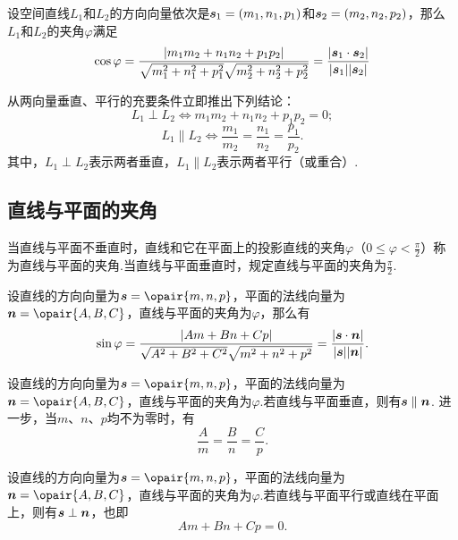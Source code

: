 \begin{theorem}
设空间直线\(L_1\)和\(L_2\)的方向向量依次是\(\boldsymbol{s}_1=(m_1,n_1,p_1)\)和\(\boldsymbol{s}_2=(m_2,n_2,p_2)\)，那么\(L_1\)和\(L_2\)的夹角\(\varphi\)满足\[
\cos\varphi
=\frac{\abs{m_1m_2+n_1n_2+p_1p_2}}{\sqrt{m_1^2+n_1^2+p_1^2}\sqrt{m_2^2+n_2^2+p_2^2}}
=\frac{\abs{\boldsymbol{s}_1 \cdot \boldsymbol{s}_2}}{\abs{\boldsymbol{s}_1}\abs{\boldsymbol{s}_2}}
\]
\end{theorem}

\begin{corollary}
从两向量垂直、平行的充要条件立即推出下列结论：\[
L_1 \perp L_2
	\iff m_1 m_2 + n_1 n_2 + p_1 p_2 = 0;
\]\[
L_1 \parallel L_2
	\iff \frac{m_1}{m_2} = \frac{n_1}{n_2} = \frac{p_1}{p_2}.
\]
其中，\(L_1 \perp L_2\)表示两者垂直，\(L_1 \parallel L_2\)表示两者平行（或重合）.
\end{corollary}

\subsection{直线与平面的夹角}
\begin{definition}
当直线与平面不垂直时，直线和它在平面上的投影直线的夹角\(\varphi\)（\(0\leqslant\varphi<\frac{\pi}{2}\)）称为直线与平面的夹角.当直线与平面垂直时，规定直线与平面的夹角为\(\frac{\pi}{2}\).
\end{definition}

\begin{theorem}
设直线的方向向量为\(\mat{s}=\opair{m,n,p}\)，平面的法线向量为\(\mat{n}=\opair{A,B,C}\)，直线与平面的夹角为\(\varphi\)，那么有\[
\sin\varphi
=\frac{\abs{Am+Bn+Cp}}{\sqrt{A^2+B^2+C^2}\sqrt{m^2+n^2+p^2}}
=\frac{\abs{\boldsymbol{s}\cdot\boldsymbol{n}}}{\abs{\boldsymbol{s}}\abs{\boldsymbol{n}}}.
\]
\end{theorem}

\begin{corollary}
设直线的方向向量为\(\mat{s}=\opair{m,n,p}\)，平面的法线向量为\(\mat{n}=\opair{A,B,C}\)，直线与平面的夹角为\(\varphi\).若直线与平面垂直，则有\(\boldsymbol{s}\parallel\boldsymbol{n}\).
进一步，当\(m\)、\(n\)、\(p\)均不为零时，有\[
\frac{A}{m}=\frac{B}{n}=\frac{C}{p}.
\]
\end{corollary}

\begin{corollary}
设直线的方向向量为\(\mat{s}=\opair{m,n,p}\)，平面的法线向量为\(\mat{n}=\opair{A,B,C}\)，直线与平面的夹角为\(\varphi\).若直线与平面平行或直线在平面上，则有\(\boldsymbol{s}\perp\boldsymbol{n}\)，也即\[
Am+Bn+Cp=0.
\]
\end{corollary}

